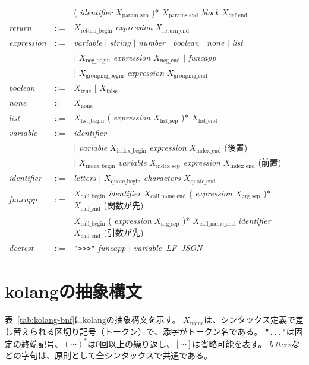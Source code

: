\documentclass{ipsjprosym}
\begin{document}
\begin{table}[t]
\begin{small}
\begin{tabular}{l c p{8cm}}
& & \quad ( \textit{identifier} $X_{\mathrm{param\_sep}}$ )* $X_{\mathrm{params\_end}}$ \textit{block} $X_{\mathrm{def\_end}}$ \\
\textit{return}      & ::= & $X_{\mathrm{return\_begin}}$ \textit{expression} $X_{\mathrm{return\_end}}$ \\
\textit{expression}  & ::= & \textit{variable} $\mid$ \textit{string} $\mid$ \textit{number} $\mid$ \textit{boolean} $\mid$ \textit{none} $\mid$ \textit{list} \\
& & $\mid$ $X_{\mathrm{neg\_begin}}$ \textit{expression} $X_{\mathrm{neg\_end}}$ $\mid$ \textit{funcapp} \\
& & $\mid$ $X_{\mathrm{grouping\_begin}}$ \textit{expression} $X_{\mathrm{grouping\_end}}$ \\
\textit{boolean}     & ::= & $X_{\mathrm{true}}$ $\mid$ $X_{\mathrm{false}}$ \\
\textit{none}        & ::= & $X_{\mathrm{none}}$ \\
\textit{list}        & ::= & $X_{\mathrm{list\_begin}}$ ( \textit{expression} $X_{\mathrm{list\_sep}}$ )* $X_{\mathrm{list\_end}}$ \\
\textit{variable}    & ::= & \textit{identifier} \\
& & $\mid$ \textit{variable} $X_{\mathrm{index\_begin}}$ \textit{expression} $X_{\mathrm{index\_end}}$ \quad (後置) \\
& & $\mid$ $X_{\mathrm{index\_begin}}$ \textit{variable} $X_{\mathrm{index\_sep}}$ \textit{expression} $X_{\mathrm{index\_end}}$ \quad (前置) \\
\textit{identifier}  & ::= & \textit{letters} $\mid$ $X_{\mathrm{quote\_begin}}$ \textit{characters} $X_{\mathrm{quote\_end}}$ \\
\textit{funcapp}     & ::= & $X_{\mathrm{call\_begin}}$ \textit{identifier} $X_{\mathrm{call\_name\_end}}$ ( \textit{expression} $X_{\mathrm{arg\_sep}}$ )* $X_{\mathrm{call\_end}}$ \quad (関数が先) \\
& & $X_{\mathrm{call\_begin}}$ ( \textit{expression} $X_{\mathrm{arg\_sep}}$ )* $X_{\mathrm{call\_name\_end}}$ \textit{identifier} $X_{\mathrm{call\_end}}$ \quad (引数が先) \\
\textit{doctest}     & ::= & \verb|">>>"| \textit{funcapp} $\mid$ \textit{variable}\ \textit{LF}\ \textit{JSON} \\
\hline
\end{tabular}
\end{small}
\end{table}




\appendix

\section{kolangの抽象構文}
\label{app:syntax}

表~\ref{tab:kolang-bnf}にkolangの抽象構文を示す。
$X_{\mathrm{name}}$は、シンタックス定義で差し替えられる区切り記号（トークン）で、添字がトークン名である。
\texttt{"..."}は固定の終端記号、$(\cdots)^{*}$は0回以上の繰り返し、$[\cdots]$は省略可能を表す。
\textit{letters}などの字句は、原則として全シンタックスで共通である。
\end{document}
